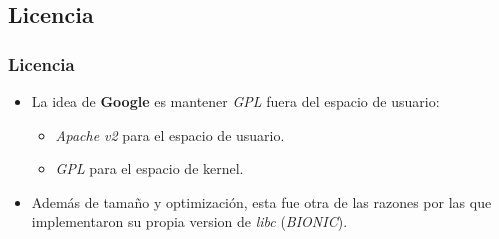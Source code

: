 \subsection{Licencia}
\begin{frame}
  \frametitle{Licencia}
  \begin{itemize}
      \item La idea de \textbf{Google} es mantener \textit{GPL} fuera del espacio de usuario:
      \begin{itemize}
	  \item \textit{Apache v2} para el espacio de usuario.
	  
	  \item \textit{GPL} para el espacio de kernel.
      \end{itemize}
      
      \item Además de tamaño y optimización, esta fue otra de las razones por las que implementaron su propia version de \textit{libc} (\textit{BIONIC}).
  \end{itemize}
\end{frame}
